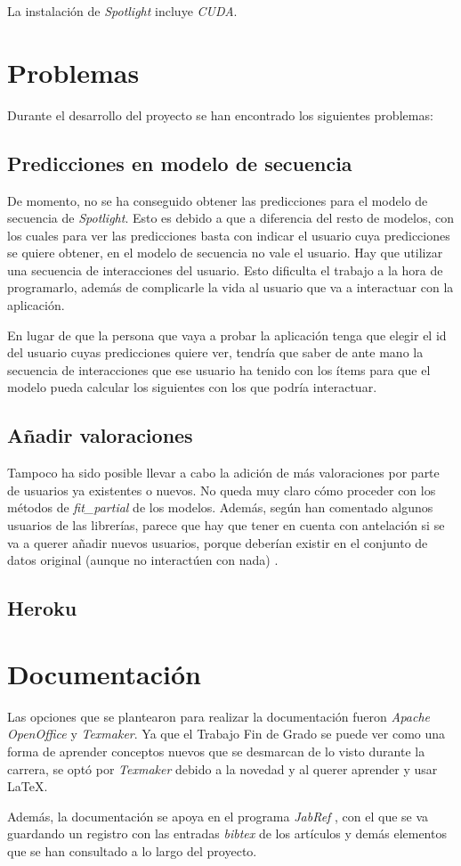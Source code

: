 La instalación de \textit{Spotlight} incluye \textit{CUDA}.

\section{Problemas}\label{problemas}
Durante el desarrollo del proyecto se han encontrado los siguientes problemas:

\subsection{Predicciones en modelo de secuencia}\label{predicciones-secuencia}
De momento, no se ha conseguido obtener las predicciones para el modelo de secuencia de \textit{Spotlight}. Esto es debido a que a diferencia del resto de modelos, con los cuales para ver las predicciones basta con indicar el usuario cuya predicciones se quiere obtener, en el modelo de secuencia no vale el usuario. Hay que utilizar una secuencia de interacciones del usuario. Esto dificulta el trabajo a la hora de programarlo, además de complicarle la vida al usuario que va a interactuar con la aplicación.

En lugar de que la persona que vaya a probar la aplicación tenga que elegir el id del usuario cuyas predicciones quiere ver, tendría que saber de ante mano la secuencia de interacciones que ese usuario ha tenido con los ítems para que el modelo pueda calcular los siguientes con los que podría interactuar.

\subsection{Añadir valoraciones}\label{mas-valoraciones}
Tampoco ha sido posible llevar a cabo la adición de más valoraciones por parte de usuarios ya existentes o nuevos. No queda muy claro cómo proceder con los métodos de \textit{fit\_partial} de los modelos. Además, según han comentado algunos usuarios de las librerías, parece que hay que tener en cuenta con antelación si se va a querer añadir nuevos usuarios, porque deberían existir en el conjunto de datos original (aunque no interactúen con nada) \cite{problema-mas-valoraciones}.

\subsection{Heroku}\label{heroku}


\section{Documentación}\label{documentacion}
Las opciones que se plantearon para realizar la documentación fueron \textit{Apache OpenOffice} y \textit{Texmaker}. Ya que el Trabajo Fin de Grado se puede ver como una forma de aprender conceptos nuevos que se desmarcan de lo visto durante la carrera, se optó por \textit{Texmaker} debido a la novedad y al querer aprender y usar \LaTeX{}.

Además, la documentación se apoya en el programa \textit{JabRef} \cite{jabref}, con el que se va guardando un registro con las entradas \textit{bibtex} de los artículos y demás elementos que se han consultado a lo largo del proyecto.
